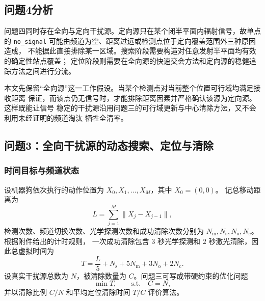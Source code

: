 \subsection{问题4分析}

问题四同时存在全向与定向干扰源。定向源只在某个闭半平面内辐射信号，故单点的
\texttt{no\_signal} 可能由频道为空、距离过远或检测点位于定向覆盖范围外三种原因造成，
不能据此直接排除某一区域。搜索阶段需要构造对任意发射半平面均有效的确定性站点覆盖；
定位阶段则需要在全向源的快速交会方法和定向源的稳健追踪方法之间进行分流。

本文先保留“全向源”这一工作假设。当某个检测点对当前整个位置可行域均满足接收距离
保证，而该点仍无信号时，才能排除距离因素并严格确认该源为定向源。这样既能让信号
稳定的干扰源沿用问题三的可行域更新与中心清除方法，又不会利用未经证明的频道淘汰
牺牲全清率。


\subsection{问题3：全向干扰源的动态搜索、定位与清除}

\subsubsection{时间目标与频道状态}

设机器狗依次执行的动作位置为 $X_0,X_1,\ldots,X_M$，其中 $X_0=(0,0)$。
记总移动距离为
\begin{equation}
L=\sum_{j=1}^{M}\|X_j-X_{j-1}\|,
\end{equation}
检测次数、频道切换次数、光学探测次数和成功清除次数分别为
$N_{\mathrm m},N_{\mathrm s},N_{\mathrm o},N_{\mathrm c}$。根据附件给出的计时规则，
一次成功清除包含 $3$ 秒光学探测和 $2$ 秒激光清除，因此总虚拟时间为
\begin{equation}
T=\frac{L}{5}+N_{\mathrm s}+5N_{\mathrm m}+3N_{\mathrm o}+2N_{\mathrm c}.
\label{eq:p3-time}
\end{equation}
设真实干扰源总数为 $N$，被清除数量为 $C$。问题三可写成带硬约束的优化问题
\begin{equation}
\min T,\qquad \text{s.t.}\quad C=N,
\label{eq:p3-objective}
\end{equation}
并以清除比例 $C/N$ 和平均定位清除时间 $T/C$ 评价算法。

